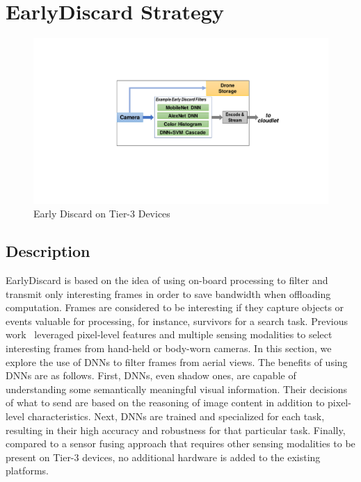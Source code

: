 
\section{{\xc EarlyDiscard} Strategy}
\label{sec:earlydiscard}

\begin{figure}
\includegraphics[trim={9cm 6.5cm 5cm 4.8cm},clip,width=\linewidth]{FIGS/fig-ondrone-early-discard.pdf}
\caption{Early Discard on Tier-3 Devices}
\label{fig:ondrone}
\end{figure}


\subsection{Description}
EarlyDiscard is based on the idea of using on-board processing to filter and
transmit only interesting frames in order to save bandwidth when offloading
computation. Frames are considered to be interesting if they capture objects or
events valuable for processing, for instance, survivors for a search task.
Previous work~\cite{Hu2015,Naderiparizi2017} leveraged pixel-level
features and multiple sensing modalities to select interesting frames from
hand-held or body-worn cameras. In this section, we explore the use of DNNs to
filter frames from aerial views. The benefits of using DNNs are as follows.
First, DNNs, even shadow ones, are capable of understanding some semantically
meaningful visual information. Their decisions of what to send are based on the
reasoning of image content in addition to pixel-level characteristics. Next,
DNNs are trained and specialized for each task, resulting in their high accuracy
and robustness for that particular task. Finally, compared to a sensor fusing
approach that requires other sensing modalities to be present on Tier-3 devices,
no additional hardware is added to the existing platforms.


